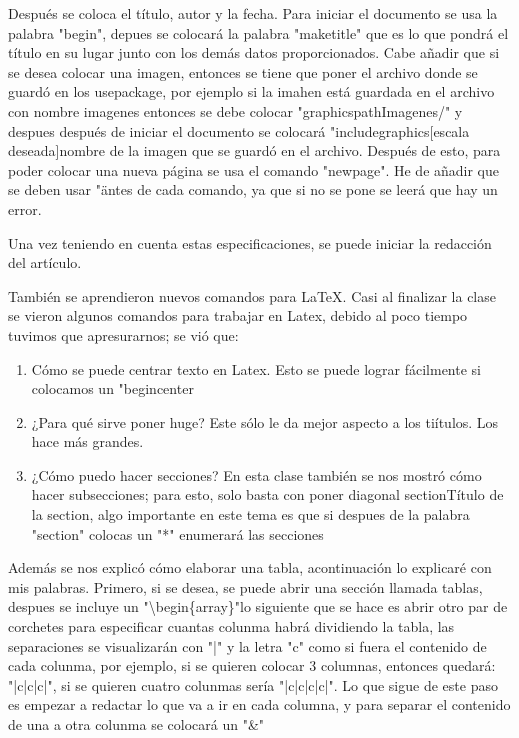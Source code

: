 \documentclass{book}
\begin{document}
	Después se coloca el título, autor y la fecha. Para iniciar el documento se usa la palabra "begin", depues se colocará la palabra "maketitle" que es lo que pondrá el título en su lugar junto con los demás datos proporcionados. Cabe añadir que si se desea colocar una imagen, entonces se tiene que poner el archivo donde se guardó en los usepackage, por ejemplo si la imahen está guardada en el archivo con nombre imagenes entonces se debe colocar "graphicspath{{Imagenes/}}" y despues después de iniciar el documento se colocará "includegraphics[escala deseada]{nombre de la imagen que se guardó en el archivo}. Después de esto, para poder colocar una nueva página se usa el comando "newpage". He de añadir que se deben usar "\" antes de cada comando, ya que si no se pone se leerá que hay un error. 
	
	Una vez teniendo en cuenta estas especificaciones, se puede iniciar la redacción del artículo. 
	
	También se aprendieron nuevos comandos para LaTeX. Casi al finalizar la clase se vieron algunos comandos para trabajar en Latex, debido al poco tiempo tuvimos que apresurarnos; se vió que:
	\begin{enumerate}
		\item 
		Cómo se puede centrar texto en Latex. Esto se puede lograr fácilmente si colocamos un "begin{center}
		\item 
		¿Para qué sirve poner huge? Este sólo le da mejor aspecto a los tiítulos. Los hace más grandes.
		\item 
		¿Cómo puedo hacer secciones? En esta clase también se nos mostró cómo hacer subsecciones; para esto, solo basta con poner diagonal section{Título de la section}, algo importante en este tema es que si despues de la palabra "section" colocas un "*"  enumerará las secciones
	\end{enumerate}
	Además se nos explicó cómo elaborar una tabla, acontinuación lo explicaré con mis palabras. Primero, si se desea, se puede abrir una sección llamada tablas, despues se incluye un "\textbackslash begin\{array\}"lo siguiente que se hace es abrir otro par de corchetes para especificar cuantas colunma habrá dividiendo la tabla, las separaciones se visualizarán con "|" y la letra "c" como si fuera el contenido de cada colunma, por ejemplo, si se quieren colocar 3 columnas, entonces quedará: "|c|c|c|", si se quieren cuatro colunmas sería "|c|c|c|c|".
	Lo que sigue de este paso es empezar a redactar lo que va a ir en cada columna, y para separar el contenido de una a otra colunma se colocará un "\&"
	
\end{document}
